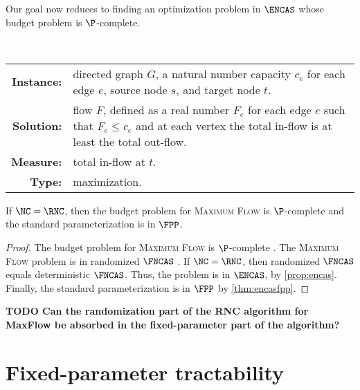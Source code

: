 \documentclass{article}
\newcommand{\todo}[1]{\textbf{TODO #1}}
\begin{document}
Our goal now reduces to finding an optimization problem in $\ENCAS$ whose budget problem is $\P$-complete.

\begin{definition}
  \mbox{} \\
  \begin{tabular}{r p{9.2cm}}
    \textbf{Instance:} & directed graph $G$, a natural number capacity $c_e$ for each edge $e$, source node $s$, and target node $t$. \\
    \textbf{Solution:} & flow $F$, defined as a real number $F_e$ for each edge $e$ such that $F_e \leq c_e$ and at each vertex the total in-flow is at least the total out-flow. \\
    \textbf{Measure:} & total in-flow at $t$. \\
    \textbf{Type:} & maximization.
  \end{tabular}
\end{definition}


\begin{theorem}
  If $\NC = \RNC$, then the budget problem for \textsc{Maximum Flow} is $\P$-complete and the standard parameterization is in $\FPP$.
\end{theorem}
\begin{proof}
  The budget problem for \textsc{Maximum Flow} is $\P$-complete \autocite[Problem~A.4.4]{ghr95}.
  The \textsc{Maximum Flow} problem is in randomized $\FNCAS$ \autocite[Theorem~4.5.2]{dsst97}.
  If $\NC = \RNC$, then randomized $\FNCAS$ equals deterministic $\FNCAS$.
  Thus, the problem is in $\ENCAS$, by \autoref{prop:encas}.
  Finally, the standard parameterization is in $\FPP$ by \autoref{thm:encasfpp}.
\end{proof}

\todo{Can the randomization part of the RNC algorithm for MaxFlow be absorbed in the fixed-parameter part of the algorithm?}


\section{Fixed-parameter tractability}
\end{document}
